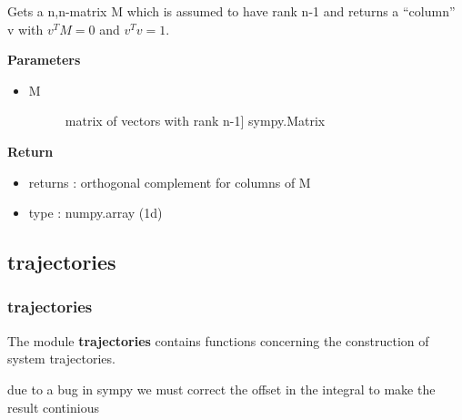 \documentclass[letterpaper,10pt,english]{sphinxmanual}
\begin{document}

\begin{fulllineitems}
\label{pycontroltools:linearcontrol.robust_poleplacement.ortho_complement}
Gets a n,n-matrix M which is assumed to have rank n-1 and 
returns a ``column'' v with $v^T M = 0$ and $v^T v = 1$.

\textbf{Parameters}
\begin{itemize}
\item {} \begin{description}
\item[{M}] \leavevmode{[}matrix of vectors with rank n-1{]}
sympy.Matrix

\end{description}

\end{itemize}

\textbf{Return}
\begin{itemize}
\item {} 
returns : orthogonal complement for columns of M

\item {} 
type : numpy.array (1d)

\end{itemize}

\end{fulllineitems}



\subsection{\textbf{trajectories}}
\label{pycontroltools:trajectories}

\subsubsection{\textbf{trajectories}}
\label{pycontroltools:id6}
The module \textbf{trajectories} contains functions concerning the construction
of system trajectories.
\label{pycontroltools:module-trajectories.trajectories}\label{pycontroltools:module-trajectories}

\begin{fulllineitems}
\label{pycontroltools:trajectories.trajectories.integrate_pw}
due to a bug in sympy we must correct the offset in the integral
to make the result continious

\end{fulllineitems}
\end{document}
